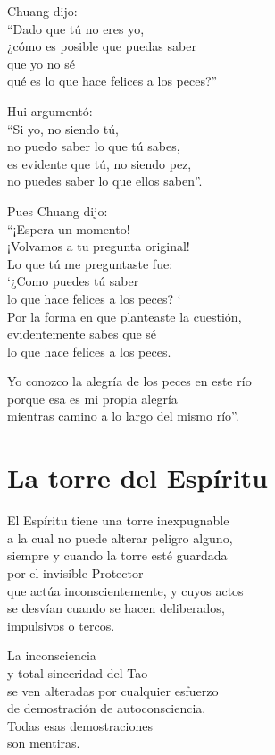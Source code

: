 \documentclass[book,b5paper,hidelinks,final]{memoir}
\begin{document}
	Chuang dijo:\\
	``Dado que tú no eres yo,\\
	¿cómo es posible que puedas saber\\
	que yo no sé\\
	qué es lo que hace felices a los peces?''
	
	Hui argumentó:\\
	``Si yo, no siendo tú,\\
	no puedo saber lo que tú sabes,\\
	es evidente que tú, no siendo pez,\\
	no puedes saber lo que ellos saben''.
	
	Pues Chuang dijo:\\
	``¡Espera un momento!\\
	¡Volvamos a tu pregunta original!\\
	Lo que tú me preguntaste fue:\\
	`¿Como puedes tú saber\\
	lo que hace felices a los peces? `\\
	Por la forma en que planteaste la cuestión,\\
	evidentemente sabes que sé\\
	lo que hace felices a los peces.
	
	Yo conozco la alegría de los peces en este río\\
	porque esa es mi propia alegría\\
	mientras camino a lo largo del mismo río''.
	
	\chapter*{La torre del Espíritu}
	
	El Espíritu tiene una torre inexpugnable\\
	a la cual no puede alterar peligro alguno,\\
	siempre y cuando la torre esté guardada\\
	por el invisible Protector\\
	que actúa inconscientemente, y cuyos actos\\
	se desvían cuando se hacen deliberados,\\
	impulsivos o tercos.
	
	La inconsciencia\\
	y total sinceridad del Tao\\
	se ven alteradas por cualquier esfuerzo\\
	de demostración de autoconsciencia.\\
	Todas esas demostraciones\\
	son mentiras.
	
\end{document}
